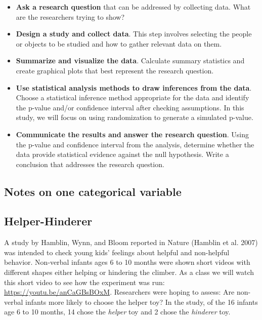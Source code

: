 \documentclass[
]{report}
\begin{document}
\begin{itemize}
\item
  \textbf{Ask a research question} that can be addressed by collecting data. What are the researchers trying to show?
\item
  \textbf{Design a study and collect data}. This step involves selecting the people or objects to be studied and how to gather relevant data on them.
\item
  \textbf{Summarize and visualize the data}. Calculate summary statistics and create graphical plots that best represent the research question.
\item
  \textbf{Use statistical analysis methods to draw inferences from the data}. Choose a statistical inference method appropriate for the data and identify the p-value and/or confidence interval after checking assumptions. In this study, we will focus on using randomization to generate a simulated p-value.
\item
  \textbf{Communicate the results and answer the research question}. Using the p-value and confidence interval from the analysis, determine whether the data provide statistical evidence against the null hypothesis. Write a conclusion that addresses the research question.
\end{itemize}

\newpage

\subsection*{Notes on one categorical variable}\label{notes-on-one-categorical-variable}

\vspace{2in}

\subsection{Helper-Hinderer}\label{helper-hinderer}

A study by Hamblin, Wynn, and Bloom reported in Nature (Hamblin et al. 2007) was intended to check young kids' feelings about helpful and non-helpful behavior. Non-verbal infants ages 6 to 10 months were shown short videos with different shapes either helping or hindering the climber. As a class we will watch this short video to see how the experiment was run: \url{https://youtu.be/anCaGBsBOxM}. Researchers were hoping to assess: Are non-verbal infants more likely to choose the helper toy? In the study, of the 16 infants age 6 to 10 months, 14 chose the \emph{helper} toy and 2 chose the \emph{hinderer} toy.
\end{document}
